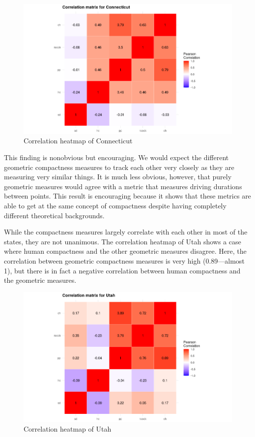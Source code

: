 \documentclass[]{article}
\begin{document}
\begin{figure}
\centering
\includegraphics{../30_results/corr_matrix_connecticut.png}
\caption{Correlation heatmap of Connecticut \label{connecticut_corr}}
\end{figure}

This finding is nonobvious but encouraging. We would expect the
different geometric compactness measures to track each other very
closely as they are measuring very similar things. It is much less
obvious, however, that purely geometric measures would agree with a
metric that measures driving durations between points. This result is
encouraging because it shows that these metrics are able to get at the
same concept of compactness despite having completely different
theoretical backgrounds.

While the compactness measures largely correlate with each other in most
of the states, they are not unanimous. The correlation heatmap of Utah
shows a case where human compactness and the other geometric measures
disagree. Here, the correlation between geometric compactness measures
is very high (0.89---almost 1), but there is in fact a negative
correlation between human compactness and the geometric measures.

\begin{figure}
\centering
\includegraphics{../30_results/corr_matrix_utah.png}
\caption{Correlation heatmap of Utah}
\end{figure}
\end{document}
